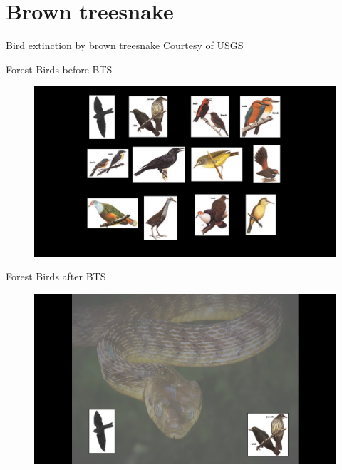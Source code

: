 \documentclass[]{beamer}
\begin{document}
\section{Brown treesnake}

\begin{frame}{Bird extinction by brown treesnake}
    \tiny{Courtesy of USGS}
\end{frame}

\begin{frame}{Forest Birds before BTS}
	\begin{figure}
		\includegraphics[height=0.8\textheight]{birds-before-bts.png}
	\end{figure}
\end{frame}

\begin{frame}{Forest Birds after BTS}
	\begin{figure}
		\includegraphics[height=0.8\textheight]{birds-after-bts.png}
	\end{figure}
\end{frame}
\end{document}
